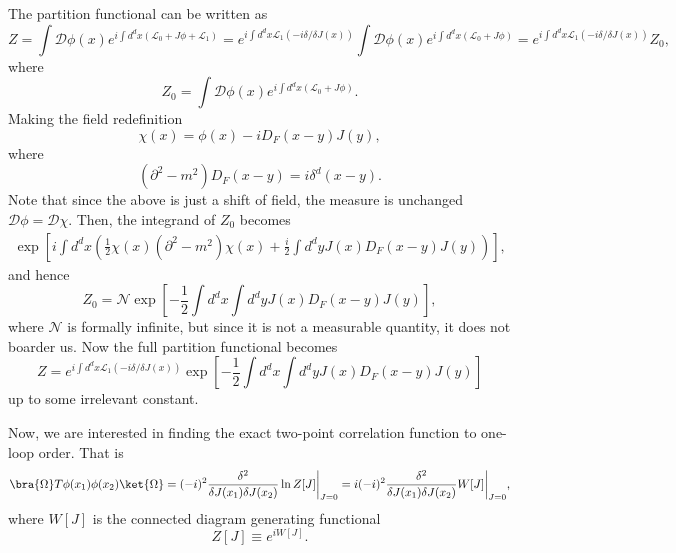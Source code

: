 The partition functional can be written as
\begin{equation}
    Z = \int\mathcal{D}\phi(x) e^{i\int d^dx (\mathcal{L}_0 + J\phi + \mathcal{L}_1)} =  e^{i\int d^dx \mathcal{L}_1(-i\delta/\delta J(x))}\int\mathcal{D}\phi(x) e^{i\int d^dx (\mathcal{L}_0 + J\phi)} = e^{i\int d^dx \mathcal{L}_1(-i\delta/\delta J(x))} Z_0,
\end{equation}
where
\begin{equation}
    Z_0 = \int\mathcal{D}\phi(x) e^{i\int d^dx (\mathcal{L}_0 + J\phi)}.
\end{equation}
Making the field redefinition
\begin{equation}
    \chi(x) = \phi(x) - iD_F(x-y) J(y),
\end{equation}
where
\begin{equation}
    (\partial^2 - m^2)D_F(x-y)= i\delta^d(x-y).
\end{equation}
Note that since the above is just a shift of field, the measure is unchanged $\mathcal{D}\phi = \mathcal{D}\chi$.
Then, the integrand of $Z_0$ becomes
\begin{equation}
\begin{aligned}
    \exp\left[i\int d^dx \left(\frac{1}{2}\chi(x)(\partial^2-m^2)\chi(x) +\frac{i}{2}\int d^dy J(x)D_F(x-y)J(y) \right)\right],
\end{aligned}
\end{equation}
and hence
\begin{equation}
    Z_0 = \mathcal{N}\exp\left[-\frac{1}{2}\int d^dx \int d^dy J(x)D_F(x-y)J(y) \right],
\end{equation}
where $\mathcal{N}$ is formally infinite, but since it is not a measurable quantity, it does not boarder us. Now the full partition functional becomes
\begin{equation}
    Z  = e^{i\int d^dx \mathcal{L}_1(-i\delta/\delta J(x))}\exp\left[-\frac{1}{2}\int d^dx \int d^dy J(x)D_F(x-y)J(y) \right]
\end{equation}
up to some irrelevant constant.

Now, we are interested in finding the exact two-point correlation function to one-loop order. That is
\begin{equation}
    \bra{\Omega}T\phi(x_1)\phi(x_2)\ket{\Omega} = (-i)^2 \frac{\delta^2}{\delta J(x_1)\delta J(x_2)}\ln{Z[J]}\bigg|_{J=0} = i(-i)^2\frac{\delta^2}{\delta J(x_1)\delta J(x_2)}W[J]\bigg|_{J=0},
\end{equation}
where $W[J]$ is the connected diagram generating functional
\begin{equation}
    Z[J] \equiv e^{iW[J]}.
\end{equation}

